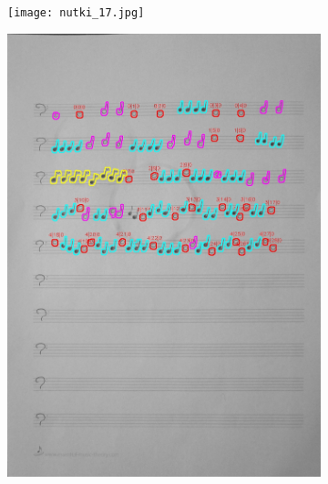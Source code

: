 \documentclass[11pt]{article}
\begin{document}
\begin{figure}[H]
    \centering
    \begin{subfigure}{.5\textwidth}
        \centering
        \graphicspath{ {Resources/} }
        \texttt{[image: nutki\_17.jpg]}
        \label{fig:sub1}
    \end{subfigure}%
    \begin{subfigure}{.5\textwidth}
        \centering
        \graphicspath{ {blobs/} }
        \includegraphics[width=\linewidth]{17_cnts.jpg}
        \label{fig:sub2}
    \end{subfigure}
    \label{fig:test}
\end{figure}
\end{document}
